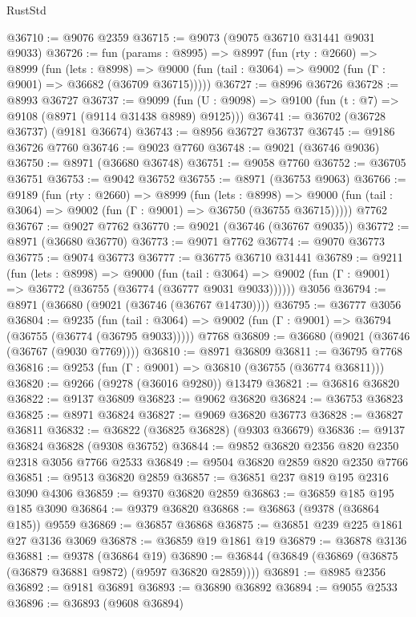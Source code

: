 \begin{lexlean}{RustStd}
\begin{coremodule}
@36710 := @9076 @2359
@36715 := @9073 (@9075 @36710 @31441 @9031 @9033)
@36726 := fun (params : @8995) =>
  @8997
    (fun (rty : @2660) =>
    @8999
      (fun (lets : @8998) =>
      @9000 (fun (tail : @3064) => @9002 (fun (Γ : @9001) => @36682 (@36709 @36715)))))
@36727 := @8996 @36726
@36728 := @8993 @36727
@36737 := @9099
    (fun (U : @9098) => @9100 (fun (t : @7) => @9108 (@8971 (@9114 @31438 @8989) @9125)))
@36741 := @36702 (@36728 @36737) (@9181 @36674)
@36743 := @8956 @36727 @36737
@36745 := @9186 @36726 @7760
@36746 := @9023 @7760
@36748 := @9021 (@36746 @9036)
@36750 := @8971 (@36680 @36748)
@36751 := @9058 @7760
@36752 := @36705 @36751
@36753 := @9042 @36752
@36755 := @8971 (@36753 @9063)
@36766 := @9189
    (fun (rty : @2660) =>
    @8999
      (fun (lets : @8998) =>
      @9000 (fun (tail : @3064) => @9002 (fun (Γ : @9001) => @36750 (@36755 @36715)))))
    @7762
@36767 := @9027 @7762
@36770 := @9021 (@36746 (@36767 @9035))
@36772 := @8971 (@36680 @36770)
@36773 := @9071 @7762
@36774 := @9070 @36773
@36775 := @9074 @36773
@36777 := @36775 @36710 @31441
@36789 := @9211
    (fun (lets : @8998) =>
    @9000
      (fun (tail : @3064) =>
      @9002 (fun (Γ : @9001) => @36772 (@36755 (@36774 (@36777 @9031 @9033))))))
    @3056
@36794 := @8971 (@36680 (@9021 (@36746 (@36767 @14730))))
@36795 := @36777 @3056
@36804 := @9235
    (fun (tail : @3064) => @9002 (fun (Γ : @9001) => @36794 (@36755 (@36774 (@36795 @9033)))))
    @7768
@36809 := @36680 (@9021 (@36746 (@36767 (@9030 @7769))))
@36810 := @8971 @36809
@36811 := @36795 @7768
@36816 := @9253 (fun (Γ : @9001) => @36810 (@36755 (@36774 @36811)))
@36820 := @9266 (@9278 (@36016 @9280)) @13479
@36821 := @36816 @36820
@36822 := @9137 @36809
@36823 := @9062 @36820
@36824 := @36753 @36823
@36825 := @8971 @36824
@36827 := @9069 @36820 @36773
@36828 := @36827 @36811
@36832 := @36822 (@36825 @36828) (@9303 @36679)
@36836 := @9137 @36824 @36828 (@9308 @36752)
@36844 := @9852 @36820 @2356 @820 @2350 @2318 @3056 @7766 @2533
@36849 := @9504 @36820 @2859 @820 @2350 @7766
@36851 := @9513 @36820 @2859
@36857 := @36851 @237 @819 @195 @2316 @3090 @4306
@36859 := @9370 @36820 @2859
@36863 := @36859 @185 @195 @185 @3090
@36864 := @9379 @36820
@36868 := @36863 (@9378 (@36864 @185)) @9559
@36869 := @36857 @36868
@36875 := @36851 @239 @225 @1861 @27 @3136 @3069
@36878 := @36859 @19 @1861 @19
@36879 := @36878 @3136
@36881 := @9378 (@36864 @19)
@36890 := @36844 (@36849 (@36869 (@36875 (@36879 @36881 @9872) (@9597 @36820 @2859))))
@36891 := @8985 @2356
@36892 := @9181 @36891
@36893 := @36890 @36892
@36894 := @9055 @2533
@36896 := @36893 (@9608 @36894)

\end{coremodule}
\end{lexlean}

